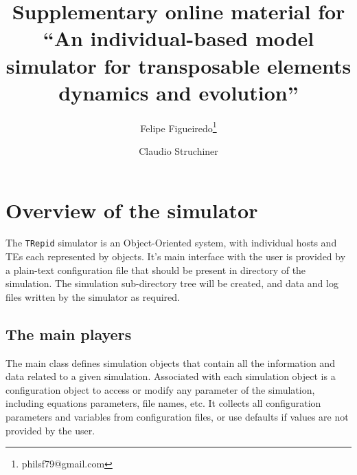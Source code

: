 \documentclass[10pt]{article}
\begin{document}
\title{Supplementary online material for ``An individual-based model
  simulator for transposable elements dynamics and evolution''}


\author{Felipe Figueiredo\footnote{philsf79@gmail.com} \and
  Claudio Struchiner }



\maketitle
\tableofcontents

\section{Overview of the simulator}


The \verb|TRepid| simulator is an Object-Oriented system, with
individual hosts and TEs each represented by objects. It's main
interface with the user is provided by a plain-text configuration file
that should be present in directory of the simulation. The simulation
sub-directory tree will be created, and data and log files written by
the simulator as required.

\subsection{The main players}
\label{sec:main_players}

The main class defines simulation objects that contain all the
information and data related to a given simulation. Associated with
each simulation object is a configuration object to access or modify
any parameter of the simulation, including equations parameters, file
names, etc. It collects all configuration parameters and variables
from configuration files, or use defaults if values are not provided
by the user.




\end{document}
